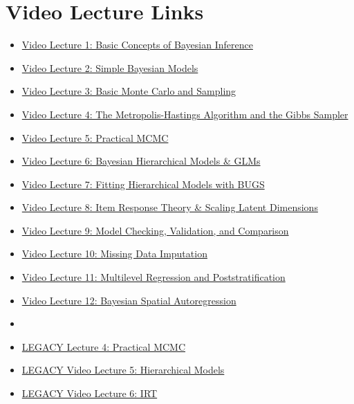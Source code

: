 \documentclass[11pt, leqno, fleqn]{article}
\begin{document}
\section*{Video Lecture Links}
\vspace{10pt}
\begin{itemize}
\item[] \href{http://youtu.be/BOWNHl3qOVA}{Video Lecture 1: Basic Concepts of Bayesian Inference} \\
\item[] \href{http://youtu.be/ps5MYi81IsE}{Video Lecture 2: Simple Bayesian Models} \\
\item[] \href{http://youtu.be/cxWzsCoYT8Q}{Video Lecture 3: Basic Monte Carlo and Sampling} \\
\item[] \href{}{Video Lecture 4: The Metropolis-Hastings Algorithm and the Gibbs Sampler} \\
\item[] \href{}{Video Lecture 5: Practical MCMC} \\
\item[] \href{}{Video Lecture 6: Bayesian Hierarchical Models \& GLMs} \\
\item[] \href{}{Video Lecture 7: Fitting Hierarchical Models with BUGS} \\
\item[] \href{}{Video Lecture 8: Item Response Theory \& Scaling Latent Dimensions} \\
\item[] \href{}{Video Lecture 9: Model Checking, Validation, and Comparison} \\
\item[] \href{}{Video Lecture 10: Missing Data Imputation} \\
\item[] \href{}{Video Lecture 11: Multilevel Regression and Poststratification} \\
\item[] \href{}{Video Lecture 12: Bayesian Spatial Autoregression} \\
\item[]
\item[] \href{http://youtu.be/bGKgkK9vETQ}{LEGACY Lecture 4: Practical MCMC} \\
\item[] \href{http://youtu.be/tbQkKu01kb8}{LEGACY Video Lecture 5: Hierarchical Models} \\
\item[] \href{http://youtu.be/dfPq_WTFzQ0}{LEGACY Video Lecture 6: IRT} \\

\end{itemize}
\end{document}
